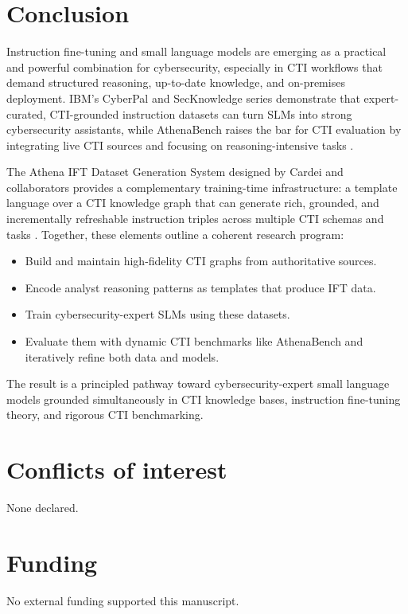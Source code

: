 \documentclass[unnumsec,webpdf,contemporary,large]{oup-authoring-template}
\theoremstyle{thmstyleone}
\theoremstyle{thmstyletwo}
\theoremstyle{thmstylethree}
\begin{document}
\section{Conclusion}

Instruction fine-tuning and small language models are emerging as a practical and powerful combination for cybersecurity, especially in CTI workflows that demand structured reasoning, up-to-date knowledge, and on-premises deployment. IBM's CyberPal and SecKnowledge series demonstrate that expert-curated, CTI-grounded instruction datasets can turn SLMs into strong cybersecurity assistants, while AthenaBench raises the bar for CTI evaluation by integrating live CTI sources and focusing on reasoning-intensive tasks \cite{levi2024cyberpal,levi2025toward,alam2025athenabench}.

The Athena IFT Dataset Generation System designed by Cardei and collaborators provides a complementary training-time infrastructure: a template language over a CTI knowledge graph that can generate rich, grounded, and incrementally refreshable instruction triples across multiple CTI schemas and tasks \cite{cardei2025ift}. Together, these elements outline a coherent research program:

\begin{itemize}
  \item Build and maintain high-fidelity CTI graphs from authoritative sources.
  \item Encode analyst reasoning patterns as templates that produce IFT data.
  \item Train cybersecurity-expert SLMs using these datasets.
  \item Evaluate them with dynamic CTI benchmarks like AthenaBench and iteratively refine both data and models.
\end{itemize}

The result is a principled pathway toward cybersecurity-expert small language models grounded simultaneously in CTI knowledge bases, instruction fine-tuning theory, and rigorous CTI benchmarking.


\section{Conflicts of interest}
None declared.

\section{Funding}
No external funding supported this manuscript.
\end{document}

